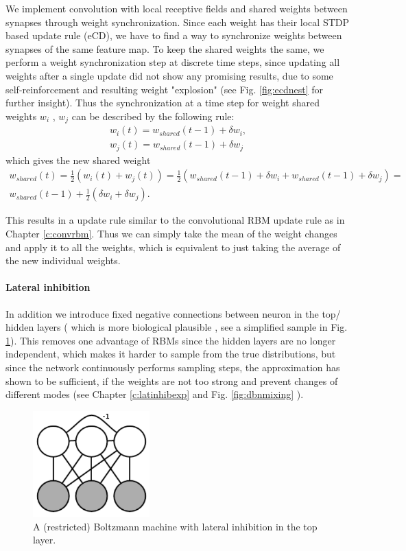 We implement convolution with local receptive fields and shared weights between synapses through weight synchronization.
Since each weight has their local STDP based update rule (eCD), we have to find a way to synchronize weights between synapses of the same feature map.
To keep the shared weights the same, we perform a weight synchronization step at discrete time steps, since updating all weights after a single update did not show any promising results, due to some self-reinforcement and resulting weight "explosion" (see Fig. \ref{fig:ecdnest} for further insight).
Thus the synchronization at a time step for weight shared weights $w_i$ , $w_j$ can be described by the following rule:  
\[
\begin{split}
w_i(t) = w_{shared}(t-1) + \delta w_i, \\ 
w_j(t) = w_{shared}(t-1) + \delta w_j 
\end{split}
\]
which gives the new shared weight
\[
\begin{split}
w_{shared}(t) = \frac{1}{2} (w_i(t) + w_j(t) ) = \frac{1}{2} (w_{shared}(t-1) + \delta w_i + w_{shared}(t-1) + \delta w_j) = \\ w_{shared}(t-1) + \frac{1}{2} (\delta w_i + \delta w_j).
\end{split}
\]

This results in a update rule similar to the convolutional RBM update rule as in Chapter \ref{c:convrbm}.
Thus we can simply take the mean of the weight changes and apply it to all the weights, which is equivalent to just taking the average of the new individual weights. 

\paragraph{Lateral inhibition} \label{c:latinhib}
In addition we introduce fixed negative connections between neuron in the top/ hidden layers ( which is more biological plausible \cite{King2013} , see a simplified sample in Fig. \ref{fig:bminhib}).
This removes one advantage of RBMs since the hidden layers are no longer independent, which makes it harder to sample from the true distributions, but since the network continuously performs sampling steps, the approximation has shown to be sufficient, if the weights are not too strong and prevent changes of different modes (see Chapter \ref{c:latinhibexp} and Fig. \ref{fig:dbnmixing} ).

\begin{figure}
	\centering
    	\includegraphics[width=0.4\textwidth]{imgs/lateral_inhib.png} 
    \caption{A (restricted) Boltzmann machine with lateral inhibition in the top layer.}
	\label{fig:bminhib}
\end{figure}


